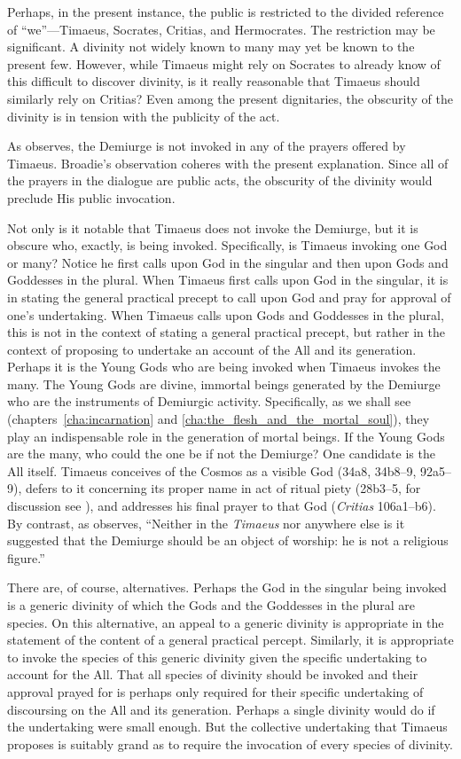 Perhaps, in the present instance, the public is restricted to the divided reference of ``we''---Timaeus, Socrates, Critias, and Hermocrates. The restriction may be significant. A divinity not widely known to many may yet be known to the present few. However, while Timaeus might rely on Socrates to already know of this difficult to discover divinity, is it really reasonable that Timaeus should similarly rely on Critias? Even among the present dignitaries, the obscurity of the divinity is in tension with the publicity of the act.

As \citet[13--4]{Broadie:2012vl} observes, the Demiurge is not invoked in any of the prayers offered by Timaeus. Broadie's observation coheres with the present explanation. Since all of the prayers in the dialogue are public acts, the obscurity of the divinity would preclude His public invocation.

Not only is it notable that Timaeus does not invoke the Demiurge, but it is obscure who, exactly, is being invoked. Specifically, is Timaeus invoking one God or many? Notice he first calls upon God in the singular and then upon Gods and Goddesses in the plural. When Timaeus first calls upon God in the singular, it is in stating the general practical precept to call upon God and pray for approval of one's undertaking. When Timaeus calls upon Gods and Goddesses in the plural, this is not in the context of stating a general practical precept, but rather in the context of proposing to undertake an account of the All and its generation. Perhaps it is the Young Gods who are being invoked when Timaeus invokes the many. The Young Gods are divine, immortal beings generated by the Demiurge who are the instruments of Demiurgic activity. Specifically, as we shall see (chapters~\ref{cha:incarnation} and \ref{cha:the_flesh_and_the_mortal_soul}), they play an indispensable role in the generation of mortal beings. If the Young Gods are the many, who could the one be if not the Demiurge? One candidate is the All itself. Timaeus conceives of the Cosmos as a visible God (34a8, 34b8--9, 92a5--9), defers to it concerning its proper name in act of ritual piety (28b3--5, for discussion see \citealt[66]{Taylor:1928qb}), and addresses his final prayer to that God (\emph{Critias} 106a1--b6). By contrast, as \citet[35]{Cornford:1935fk} observes, ``Neither in the \emph{Timaeus} nor anywhere else is it suggested that the Demiurge should be an object of worship: he is not a religious figure.''

There are, of course, alternatives. Perhaps the God in the singular being invoked is a generic divinity of which the Gods and the Goddesses in the plural are species. On this alternative, an appeal to a generic divinity is appropriate in the statement of the content of a general practical percept. Similarly, it is appropriate to invoke the species of this generic divinity given the specific undertaking to account for the All. That all species of divinity should be invoked and their approval prayed for is perhaps only required for their specific undertaking of discoursing on the All and its generation. Perhaps a single divinity would do if the undertaking were small enough. But the collective undertaking that Timaeus proposes is suitably grand as to require the invocation of every species of divinity.

